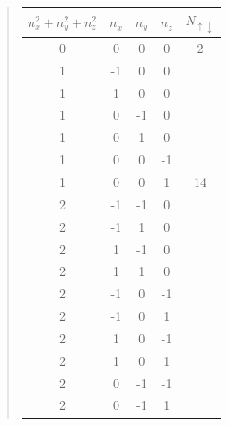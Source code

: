 \documentclass[%
oneside,                 %
final,                   %
10pt]{article}
\newenvironment{doconceexercise}{}{}
\begin{document}
\begin{doconceexercise}
\begin{quote}
\begin{tabular}{ccccc}
\hline
\multicolumn{1}{c}{ $n_{x}^{2}+n_{y}^{2}+n_{z}^{2}$ } & \multicolumn{1}{c}{ $n_{x}$ } & \multicolumn{1}{c}{ $n_{y}$ } & \multicolumn{1}{c}{ $n_{z}$ } & \multicolumn{1}{c}{ $N_{\uparrow \downarrow }$ } \\
\hline
0                               & 0       & 0       & 0       & 2                          \\
\hline
1                               & -1      & 0       & 0       &                            \\
1                               & 1       & 0       & 0       &                            \\
1                               & 0       & -1      & 0       &                            \\
1                               & 0       & 1       & 0       &                            \\
1                               & 0       & 0       & -1      &                            \\
1                               & 0       & 0       & 1       & 14                         \\
\hline
2                               & -1      & -1      & 0       &                            \\
2                               & -1      & 1       & 0       &                            \\
2                               & 1       & -1      & 0       &                            \\
2                               & 1       & 1       & 0       &                            \\
2                               & -1      & 0       & -1      &                            \\
2                               & -1      & 0       & 1       &                            \\
2                               & 1       & 0       & -1      &                            \\
2                               & 1       & 0       & 1       &                            \\
2                               & 0       & -1      & -1      &                            \\
2                               & 0       & -1      & 1       &                            \\

\end{tabular}
\end{quote}
\end{doconceexercise}
\end{document}
